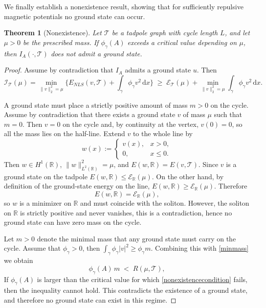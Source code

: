 \documentclass[12pt,a4paper]{amsart}
\theoremstyle{definition}
\theoremstyle{plain}
\newtheorem{theorem}[definition]{Theorem}
\numberwithin{equation}{section}
\begin{document}
We finally establish a nonexistence result, showing that for sufficiently repulsive magnetic potentials no ground state can occur. 

\begin{theorem}[Nonexistence]
Let $\mathcal{T}$ be a tadpole graph with cycle length $L$, and let $\mu>0$ be the
prescribed mass.
If $\phi_\gamma(A)$ exceeds a critical value depending on $\mu$, then
$I_A(\cdot,\mathcal{T})$ does not admit a ground state.
\end{theorem}

\begin{proof}
Assume by contradiction that $I_A$ admits a ground state $u$. Then
\begin{equation}
\mathcal I_{\mathcal{T}}(\mu)
= \min_{\|v\|_2^2=\mu}
\Big\{ E_{NLS}(v,\mathcal{T}) + \int_{\gamma} \phi_\gamma v^2\,\textrm{d}x \Big\}
\;\ge\;
\mathcal{E}_{\mathcal{T}}(\mu)
+ \min_{\|v\|_2^2=\mu} \int_{\gamma} \phi_\gamma v^2\,\textrm{d}x .
\label{minmass}
\end{equation}

A ground state must place a strictly positive amount of mass $m>0$ on the cycle.
Assume by contradiction that there exists a ground state $v$ of mass $\mu$ such that $m=0$.
Then $v=0$ on the cycle and, by continuity at the vertex, $v(0)=0$, so all the mass
lies on the half-line.
Extend $v$ to the whole line by
\[
w(x) :=
\begin{cases}
v(x), & x > 0,\\[2pt]
0, & x \le 0.
\end{cases}
\]
Then $w \in H^1(\mathbb{R})$, $\|w\|_{L^2(\mathbb{R})}^2 = \mu$, and $E(w,\mathbb{R}) = E(v,\mathcal{T}).$
Since $v$ is a ground state on the tadpole $
E(w,\mathbb{R}) \le \mathcal{E}_{\mathbb{R}}(\mu).$
On the other hand, by definition of the ground-state energy on the line,
$E(w,\mathbb{R}) \ge \mathcal{E}_{\mathbb{R}}(\mu).$
Therefore
\[
E(w,\mathbb{R}) = \mathcal{E}_{\mathbb{R}}(\mu),
\]
so $w$ is a minimizer on $\mathbb{R}$ and must coincide with the soliton.
However, the soliton on $\mathbb{R}$ is strictly positive and never vanishes, this is a contradiction, hence no ground state can have
zero mass on the cycle.


Let $m>0$ denote the minimal mass that any ground state must carry on the cycle. Assume that $\phi_{\gamma} >0 $, then $\int_{\gamma} \phi_\gamma |v|^2 \geq \phi_{\gamma} m$.
Combining this with \eqref{minmass} we obtain
\begin{equation}
\phi_\gamma(A)\, m \;<\; R(\mu,\mathcal{T}),
\label{nonexistencecondition}
\end{equation}
If $\phi_\gamma(A)$ is larger than the critical value for which
\eqref{nonexistencecondition} fails, then the inequality cannot hold.  
This contradicts the existence of a ground state, and therefore no ground state can
exist in this regime.
\end{proof}
\end{document}
